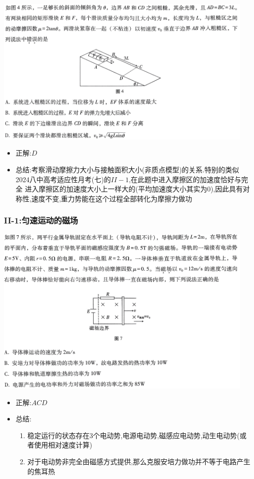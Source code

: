 \documentclass{article}
\begin{document}
\includegraphics[width=0.95\textwidth,keepaspectratio]{./pictures/3.4-1.png}

\begin{itemize}
    \item 正解:\quad $D$
    \item 总结:\quad 考察滑动摩擦力大小与接触面积大小(非质点模型)的关系.特别的类似2024八中高考适应性月考(七)的$II-1$,在此题中进入摩擦区的加速度恰好与完全
          进入摩擦区的加速度大小上一样大的(平均加速度大小其实为$0$),因此具有对称性,速度不变,重力势能在这个过程全部转化为摩擦力做功
\end{itemize}

\vspace{2em}

\subsubsection{II-1:匀速运动的磁场}
\includegraphics[width=0.95\textwidth,keepaspectratio]{./pictures/3.4-2.png}

\begin{itemize}
    \item 正解:\quad $ACD$
    \item 总结: \hspace{3em}\begin{enumerate}[label = (\arabic*{})]
              \item 稳定运行的状态存在$3$个电动势,电源电动势,磁感应电动势,动生电动势(或者使用相对速度计算)
              \item 对于电动势非完全由磁感方式提供,那么克服安培力做功并不等于电路产生的焦耳热
          \end{enumerate}
\end{itemize}
\end{document}
